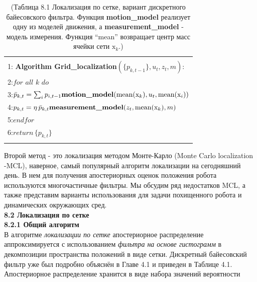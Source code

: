 \documentclass[10pt,a4paper]{article}
\begin{document}
\begin{table}[H]
\begin{center}
\begin{tabular}{|l|}
\hline
{}\\
1: \textbf{Algorithm Grid\_localization}$(\{p_{k,t-1}\},u_t,z_t,m):$ \\
2:\hspace{3mm}$\textit{for all k do}$\\
3:\hspace{7mm}$\bar{p}_{k,t}=\sum_i p_{i,t-1}\text{\textbf{motion\_model}}(\text{mean}(\text{x}_k),u_t,\text{mean}(\text{x}_i))$\\
4:\hspace{7mm}$p_{k,t}=\eta\,\bar{p}_{k,t}\text{\textbf{measurement\_model}}(z_t,\text{mean}(\text{x}_k),m)$\\
5:\hspace{3mm}$\textit{endfor}$\\
6:\hspace{3mm}$\textit{return}\,\{p_{k,t}\}$\\
{}\\
\hline
\end{tabular}
\caption{(Таблица 8.1 Локализация по сетке, вариант дискретного байесовского фильтра. Функция \textbf{motion\_model} реализует одну из моделей движения, а \textbf{measurement\_model}  - модель измерения. Функция “mean” возвращает центр масс ячейки сети $\text{x}_k$.)}
	\end{center}
\end{table}

Второй метод - это локализация методом Монте-Карло (Monte Carlo localization -MCL), наверное, самый популярный алгоритм локализации на сегодняшний день. В нем для получения апостериорных оценок положения робота используются многочастичные фильтры. Мы обсудим ряд недостатков MCL, а также представим варианты использования для задачи похищенного робота и динамических окружающих сред.
\\

\textbf{8.2	Локализация по сетке}\\

\textbf{8.2.1	Общий алгоритм}\\

В алгоритме \textit{локализации по сетке} апостериорное распределение аппроксимируется с использованием \textit{фильтра на основе гистограмм} в декомпозиции пространства положений в виде сетки. Дискретный байесовский фильтр уже был подробно объяснён в Главе 4.1 и приведен в Таблице 4.1. Апостериорное распределение хранится в виде набора значений вероятности \\
\end{document}
